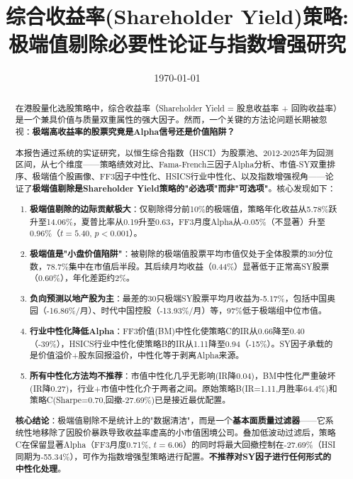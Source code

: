 \documentclass[10pt,a4paper]{ctexart}
\title{\textbf{综合收益率(Shareholder Yield)策略:\\极端值剔除必要性论证与指数增强研究}}
\author{}
\date{\today}
\begin{document}
\maketitle

\begin{abstract}
在港股量化选股策略中，综合收益率（Shareholder Yield = 股息收益率 + 回购收益率）是一个兼具价值与质量双重属性的强大因子。然而，一个关键的方法论问题长期被忽视：\textbf{极端高收益率的股票究竟是Alpha信号还是价值陷阱？}

本报告通过系统的实证研究，以恒生综合指数（HSCI）为股票池、2012-2025年为回测区间，从七个维度——策略绩效对比、Fama-French三因子Alpha分析、市值-SY双重排序、极端值个股画像、FF3因子中性化、HSICS行业中性化、以及指数增强视角——论证了\textbf{极端值剔除是Shareholder Yield策略的"必选项"而非"可选项"}。核心发现如下：

\begin{enumerate}[label=(\arabic*)]
    \item \textbf{极端值剔除的边际贡献极大}：仅剔除得分前10\%的极端值，策略年化收益从5.78\%跃升至14.06\%，夏普比率从0.19升至0.63，FF3月度Alpha从-0.05\%（不显著）升至0.96\%（$t=5.40$, $p<0.001$）。
    \item \textbf{极端值是"小盘价值陷阱"}：被剔除的极端值股票平均市值仅处于全体股票的30分位数，78.7\%集中在市值后半段。其后续月均收益（0.44\%）显著低于正常高SY股票（0.60\%），年化差距约2\%。
    \item \textbf{负向预测以地产股为主}：最差的30只极端SY股票平均月收益为-5.17\%，包括中国奥园（-16.86\%/月）、时代中国控股（-13.93\%/月）等，97\%低于极端组中位市值。
    \item \textbf{行业中性化降低Alpha}：FF3价值(BM)中性化使策略C的IR从0.66降至0.40（-39\%），HSICS行业中性化使策略B的IR从1.11降至0.94（-15\%）。SY因子承载的是价值溢价+股东回报溢价，中性化等于剥离Alpha来源。
    \item \textbf{所有中性化方法均不推荐}：市值中性化几乎无影响(IR降0.04)，BM中性化严重破坏(IR降0.27)，行业+市值中性化介于两者之间。原始策略B(IR=1.11,月胜率64.4\%)和策略C(Sharpe=0.70,回撤-27.69\%)已是接近最优配置。
\end{enumerate}

\textbf{核心结论}：极端值剔除不是统计上的"数据清洁"，而是一个\textbf{基本面质量过滤器}——它系统性地移除了因股价暴跌导致收益率虚高的小市值困境公司。叠加低波动过滤后，策略C在保留显著Alpha（FF3月度0.71\%, $t=6.06$）的同时将最大回撤控制在-27.69\%（HSI同期为-55.34\%），可作为指数增强型策略进行配置。\textbf{不推荐对SY因子进行任何形式的中性化处理}。
\end{abstract}
\end{document}
